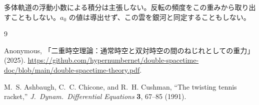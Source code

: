 \documentclass[a4paper]{article}
\begin{document}
多体軌道の浮動小数による積分は主張しない。反転の頻度をこの重みから取り出すこともしない。\(a_0\) の値は導出せず、この雲を銀河と同定することもしない。

\begin{thebibliography}{9}
\raggedright

Anonymous,
「二重時空理論：通常時空と双対時空の間のねじれとしての重力」 (2025).
\url{https://github.com/hypernumbernet/double-spacetime-doc/blob/main/double-spacetime-theory.pdf}.

M.~S. Ashbaugh, C.~C. Chicone, and R.~H. Cushman,
``The twisting tennis racket,''
\textit{J.\ Dynam.\ Differential Equations} \textbf{3}, 67--85 (1991).

\end{thebibliography}
\end{document}
